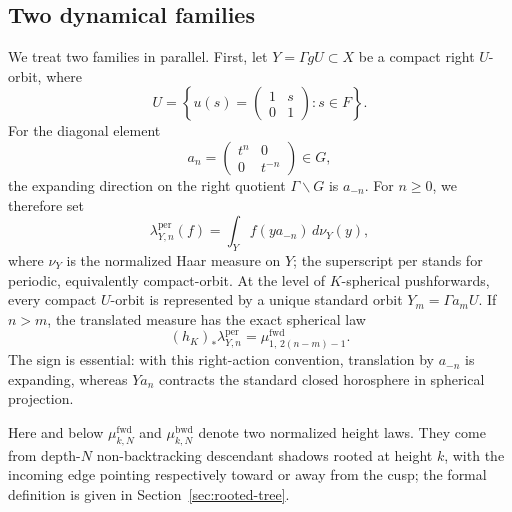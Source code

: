 \documentclass[11pt]{amsart}
\theoremstyle{definition}
\theoremstyle{plain}
\newcommand{\fwd}{\mathrm{fwd}}
\newcommand{\bwd}{\mathrm{bwd}}
\begin{document}
\subsection{Two dynamical families}
We treat two families in parallel.  First, let \(Y=\Gamma gU\subset X\) be a
compact right \(U\)-orbit, where
\[
U=\left\{u(s)=\begin{pmatrix}1&s\\0&1\end{pmatrix}:s\in F\right\}.
\]
For the diagonal element
\[
a_n=\begin{pmatrix}t^n&0\\0&t^{-n}\end{pmatrix}\in G,
\]
the expanding direction on the right quotient \(\Gamma\backslash G\) is
\(a_{-n}\).  For \(n\ge0\), we therefore set
\[
\lambda_{Y,n}^{\mathrm{per}}(f)
  =\int_Y f(y a_{-n})\,d\nu_Y(y),
\]
where \(\nu_Y\) is the normalized Haar measure on \(Y\); the superscript
\(\mathrm{per}\) stands for periodic, equivalently compact-orbit.  At the level
of \(K\)-spherical pushforwards, every compact \(U\)-orbit is represented by a
unique standard orbit \(Y_m=\Gamma a_mU\).  If \(n>m\), the translated measure
has the exact spherical law
\[
(h_K)_*\lambda_{Y,n}^{\mathrm{per}}
   =\mu^{\fwd}_{1,\,2(n-m)-1}.
\]
The sign is essential: with this right-action convention, translation by
\(a_{-n}\) is expanding, whereas \(Ya_n\) contracts the standard closed
horosphere in spherical projection.

Here and below \(\mu^{\fwd}_{k,N}\) and \(\mu^{\bwd}_{k,N}\) denote two
normalized height laws.  They come from depth-\(N\) non-backtracking descendant
shadows rooted at height \(k\), with the incoming edge pointing respectively
toward or away from the cusp; the formal definition is given in
Section~\ref{sec:rooted-tree}.
\end{document}
